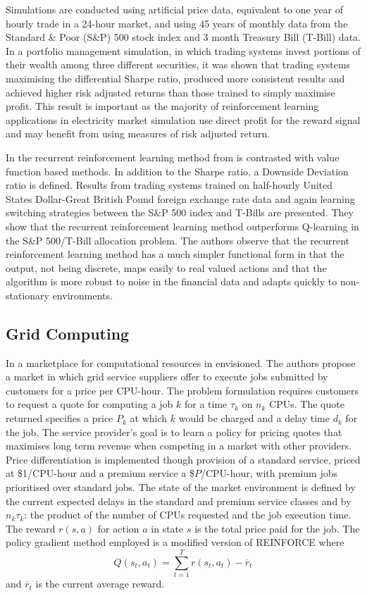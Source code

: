 Simulations are conducted using artificial price data, equivalent to one year of
hourly trade in a 24-hour market, and using 45 years of monthly data from the
Standard \& Poor (S\&P) 500 stock index and 3 month Treasury Bill (T-Bill) data.
In a portfolio management simulation, in which trading systems invest portions
of their wealth among three different securities, it was shown that trading
systems maximising the differential Sharpe ratio, produced more consistent
results and achieved higher risk adjusted returns than those trained to simply
maximise profit.  This result is important as the majority of reinforcement
learning applications in electricity market simulation use direct profit for the
reward signal and may benefit from using measures of risk adjusted return.

In  the recurrent reinforcement learning method from
 is contrasted with value function based methods.  In addition
to the Sharpe ratio, a Downside Deviation ratio is defined.  Results from
trading systems trained on half-hourly United States Dollar-Great British Pound
foreign exchange rate data and again learning switching strategies between the
S\&P 500 index and T-Bills are presented.  They show that the recurrent
reinforcement learning method outperforms Q-learning in the S\&P 500/T-Bill
allocation problem.  The authors observe that the recurrent reinforcement
learning method has a much simpler functional form in that the output, not being
discrete, maps easily to real valued actions and that the algorithm is more
robust to noise in the financial data and adapts quickly to non-stationary
environments.

\subsection{Grid Computing}
In  a marketplace for computational resources in
envisioned.  The authors propose a market in which grid service suppliers offer
to execute jobs submitted by customers for a price per CPU-hour.  The problem
formulation requires customers to request a quote for computing a job $k$ for a
time $\tau_k$ on $n_k$ CPUs.  The quote returned specifies a price $P_k$ at
which $k$ would be charged and a delay time $d_k$ for the job.  The service
provider's goal is to learn a policy for pricing quotes that maximises long term
revenue when competing in a market with other providers.  Price differentiation
is implemented though provision of a standard service, priced at \$1/CPU-hour
and a premium service a \$$P$/CPU-hour, with premium jobs prioritised over
standard jobs.  The state of the market environment is defined by the current
expected delays in the standard and premium service classes and by $n_k \tau_k$:
the product of the number of CPUs requested and the job execution time.  The
reward $r(s,a)$ for action $a$ in state $s$ is the total price paid for the job.
 The policy gradient method employed is a modified version of REINFORCE
\cite{williams:reinforce} where
\begin{equation}
Q(s_t,a_t) = \sum_{t=1}^T r(s_t,a_t) - \overline{r}_t
\end{equation}
and $\overline{r}_t$ is the current average reward.

